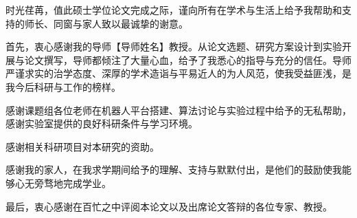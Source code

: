 

\begin{ack}

时光荏苒，值此硕士学位论文完成之际，谨向所有在学术与生活上给予我帮助和支持的师长、同窗与家人致以最诚挚的谢意。

首先，衷心感谢我的导师【导师姓名】教授。从论文选题、研究方案设计到实验开展与论文撰写，导师都倾注了大量心血，给予了我悉心的指导与充分的信任。导师严谨求实的治学态度、深厚的学术造诣与平易近人的为人风范，使我受益匪浅，是我今后科研与工作的榜样。

感谢课题组各位老师在机器人平台搭建、算法讨论与实验过程中给予的无私帮助，感谢实验室提供的良好科研条件与学习环境。

感谢相关科研项目对本研究的资助。

感谢我的家人，在我求学期间给予的理解、支持与默默付出，是他们的鼓励使我能够心无旁骛地完成学业。

最后，衷心感谢在百忙之中评阅本论文以及出席论文答辩的各位专家、教授。

\end{ack}
